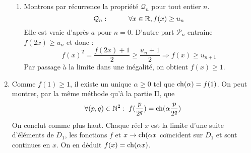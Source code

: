 \begin{enumerate}
\begin{enumerate}
 \item Montrons par récurrence la propriété $\mathcal Q_n$ pour tout entier $n$.
\begin{displaymath}
 \mathcal Q_n:\hspace{1cm} \forall x\in \mathbb{R} , f(x)\geq u_n
\end{displaymath}
Elle est vraie d'après $a$ pour $n=0$. D'autre part $\mathcal P_n$ entraine $f(2x)\geq u_n$ et donc :
\begin{displaymath}
 f(x)^2 = \frac{f(2x)+1}{2} \geq \frac{u_n+1}{2}\Rightarrow f(x)\geq u_{n+1}
\end{displaymath}
Par passage à la limite dans une inégalité, on obtient $f(x)\geq 1$.
\end{enumerate}

 \item Comme $f(1)\geq 1$, il existe un unique $\alpha\geq 0$ tel que $\operatorname{ch}(\alpha)=f(1)$. On peut montrer, par la même méthode qu'à la partie II, que 
\begin{displaymath}
 \forall(p,q)\in \mathbb{N}^2 : \; f(\frac{p}{2^q})= \operatorname{ch}(\alpha \frac{p}{2^q})
\end{displaymath}
 On conclut comme plus haut. Chaque réel $x$ est la limite d'une suite d'éléments de $D_1$, les fonctions $f$ et $x\rightarrow \operatorname{ch}(\alpha x$ coïncident sur $D_1$ et sont continues en $x$. On en déduit $f(x)=\operatorname{ch}(\alpha x)$.
\end{enumerate}
